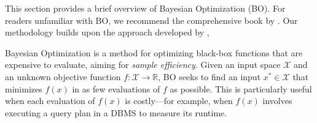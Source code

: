 


 This section provides a brief overview of Bayesian Optimization (BO). For readers unfamiliar with BO, we recommend the comprehensive book by \citet{garnett_bayesoptbook_2023}. Our methodology builds upon the approach developed by \citet{eriksson2019scalable}, 

Bayesian Optimization is a method for optimizing black-box functions that are expensive to evaluate, aiming for \emph{sample efficiency}. Given an input space $\mathcal{X}$ and an unknown objective function $f: \mathcal{X} \rightarrow \mathbb{R}$, BO seeks to find an input $x^* \in \mathcal{X}$ that minimizes $f(x)$ in as few evaluations of $f$ as possible. This is particularly useful when each evaluation of $f(x)$ is costly---for example, when $f(x)$ involves executing a query plan in a DBMS to measure its runtime.

